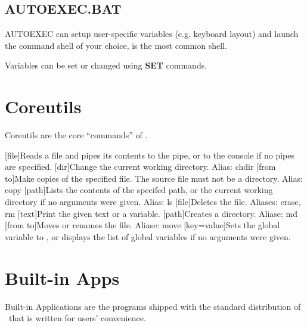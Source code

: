 \section{AUTOEXEC.BAT}

AUTOEXEC can setup user-specific variables (e.g. keyboard layout) and launch the command shell of your choice,  is the most common shell.

Variables can be set or changed using \textbf{SET} commands.



\chapter{Coreutils}

Coreutils are the core ``commands'' of \thedos.

\begin{outline}
\1[file]{Reads a file and pipes its contents to the pipe, or to the console if no pipes are specified.}
\1[dir]{Change the current working directory. Alias: chdir}
\1
\1[from to]{Make copies of the specified file. The source file must not be a directory. Alias: copy}
\1
\1[path]{Lists the contents of the specifed path, or the current working directory if no arguments were given. Alias: ls}
\1[file]{Deletes the file. Aliases: erase, rm}
\1[text]{Print the given text or a variable.}
\1
\1[path]{Creates a directory. Aliase: md}
\1[from to]{Moves or renames the file. Aliase: move}
\1
\1[key=value]{Sets the global variable  to , or displays the list of global variables if no arguments were given.}
\1
\end{outline}



\chapter{Built-in Apps}

Built-in Applications are the programs shipped with the standard distribution of \thedos\ that is written for users' convenience.

